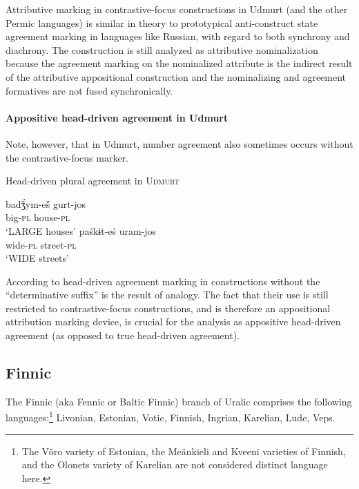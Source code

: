 Attributive marking in contrastive-focus constructions in Udmurt (and the other Permic languages) is similar in theory to prototypical anti-construct state agreement marking in languages like Russian, with regard to both synchrony and diachrony. The construction is still analyzed as attributive nominalization because the agreement marking on the nominalized attribute is the indirect result of the attributive appositional construction and the nominalizing and agreement formatives are not fused synchronically.

\paragraph{Appositive head-driven agreement in Udmurt}
Note, however, that in Udmurt, number agreement also sometimes occurs without the contrastive-focus marker.
\begin{exe}
\ex Head-driven plural agreement in \textsc{Udmurt}
\begin{xlist}
\ex 
\gll	badǯ́ym-eš́ gurt-jos\\
	big-\textsc{pl} house-\textsc{pl}\\
\glt	‘LARGE houses’ \citep[40]{winkler2001}
\ex 
\gll	paśkɨt-eś uram-jos\\
	wide-\textsc{pl} street-\textsc{pl}\\
\glt	‘WIDE streets’ \citep[63]{csucs1990}
\end{xlist}
\end{exe}
According to \citet[63]{csucs1990} head-driven agreement marking in constructions without the “determinative suffix” is the result of analogy. The fact that their use is still restricted to contrastive-focus constructions, and is therefore an appositional attribution marking device, is crucial for the analysis as appositive head-driven agreement (as opposed to true head-driven agreement).

\subsection{Finnic}
The Finnic (aka Fennic or Baltic Finnic) branch of Uralic comprises the following languages:\footnote{The Võro variety of Estonian, the Meänkieli and Kveeni varieties of Finnish, and the Olonets variety of Karelian are not considered distinct language here.} Livonian, Estonian, Votic, Finnish, Ingrian, Karelian, Lude, Veps.\\

